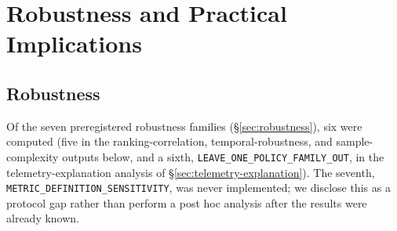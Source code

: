 \section{Robustness and Practical Implications}\label{sec:discussion}\label{sec:robustness}
\subsection{Robustness}
\label{sec:results-robustness}

Of the seven preregistered robustness families (\S\ref{sec:robustness}), six were computed (five in the ranking-correlation, temporal-robustness, and sample-complexity outputs below, and a sixth, \texttt{LEAVE\_ONE\_POLICY\_FAMILY\_OUT}, in the telemetry-explanation analysis of \S\ref{sec:telemetry-explanation}). The seventh, \texttt{METRIC\_DEFINITION\_SENSITIVITY}, was never implemented; we disclose this as a protocol gap rather than perform a post hoc analysis after the results were already known.

